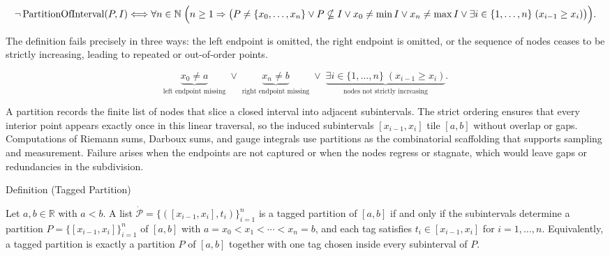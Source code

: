 \begin{remark*}
\[
\neg\operatorname{PartitionOfInterval}(P,I) \Longleftrightarrow
\forall n\in\mathbb{N}\;\Bigl(n\ge 1 \Rightarrow
\bigl(P\ne\{x_0,\ldots,x_n\}\lor P\nsubseteq I
\lor x_0\ne\min I \lor x_n\ne\max I
\lor \exists i\in\{1,\ldots,n\}\;(x_{i-1}\ge x_i)\bigr)\Bigr).
\]
\end{remark*}

\begin{remark*}
The definition fails precisely in three ways: the left endpoint is omitted, the right endpoint is omitted, or the sequence of nodes ceases to be strictly increasing, leading to repeated or out-of-order points.
\end{remark*}

\begin{remark*}
\[
\underbrace{x_0\ne a}_{\text{left endpoint missing}}
\;\lor\;
\underbrace{x_n\ne b}_{\text{right endpoint missing}}
\;\lor\;
\underbrace{\exists i\in\{1,\ldots,n\}\;(x_{i-1}\ge x_i)}_{\text{nodes not strictly increasing}}.
\]
\end{remark*}

\begin{remark*}[Interpretation]
A partition records the finite list of nodes that slice a closed interval into adjacent subintervals. The strict ordering ensures that every interior point appears exactly once in this linear traversal, so the induced subintervals $[x_{i-1},x_i]$ tile $[a,b]$ without overlap or gaps. Computations of Riemann sums, Darboux sums, and gauge integrals use partitions as the combinatorial scaffolding that supports sampling and measurement. Failure arises when the endpoints are not captured or when the nodes regress or stagnate, which would leave gaps or redundancies in the subdivision.
\end{remark*}

\NoLocalDependencies

\begin{definitionbox}{Definition (Tagged Partition)}
\begin{definition}
\label{def:tagged-partition}
Let $a,b \in \mathbb{R}$ with $a < b$. A list $\dot{\mathcal{P}}=\{([x_{i-1},x_i],t_i)\}_{i=1}^n$ is a tagged partition of $[a,b]$ if and only if the subintervals determine a partition $P=\{[x_{i-1},x_i]\}_{i=1}^n$ of $[a,b]$ with $a=x_0 < x_1 < \cdots < x_n=b$, and each tag satisfies $t_i \in [x_{i-1},x_i]$ for $i=1,\ldots,n$. Equivalently, a tagged partition is exactly a partition $P$ of $[a,b]$ together with one tag chosen inside every subinterval of $P$.
\end{definition}
\end{definitionbox}

